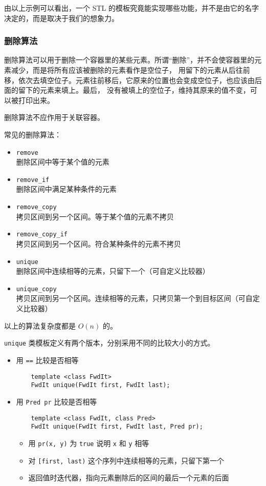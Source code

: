 \documentclass[UTF8]{ctexart}
\begin{document}
由以上示例可以看出，一个 STL 的模板究竟能实现哪些功能，并不是由它的名字决定的，而是取决于我们的想象力。

\subsubsection{删除算法}
删除算法可以用于删除一个容器里的某些元素。所谓“删除”，并不会使容器里的元素减少，而是将所有应该被删除的元素看作是空位子，
用留下的元素从后往前移，依次去填空位子。元素往前移后，它原来的位置也会变成空位子，也应该由后面的留下的元素来填上。最后，
没有被填上的空位子，维持其原来的值不变，可以被打印出来。

删除算法不应作用于关联容器。

常见的删除算法：
\begin{itemize}
    \item \texttt{remove} \\
    删除区间中等于某个值的元素
    \item \texttt{remove\_if} \\
    删除区间中满足某种条件的元素
    \item \texttt{remove\_copy} \\
    拷贝区间到另一个区间。等于某个值的元素不拷贝
    \item \texttt{remove\_copy\_if} \\
    拷贝区间到另一个区间。符合某种条件的元素不拷贝
    \item \texttt{unique} \\
    删除区间中连续相等的元素，只留下一个（可自定义比较器）
    \item \texttt{unique\_copy} \\
    拷贝区间到另一个区间。连续相等的元素，只拷贝第一个到目标区间（可自定义比较器）
\end{itemize}

以上的算法复杂度都是 $O(n)$ 的。

\texttt{unique} 类模板定义有两个版本，分别采用不同的比较大小的方式。
\begin{itemize}
    \item 用 \texttt{==} 比较是否相等
    \begin{verbatim}
    template <class FwdIt>
    FwdIt unique(FwdIt first, FwdIt last);
    \end{verbatim}
    \item 用 \texttt{Pred pr} 比较是否相等
    \begin{verbatim}
    template <class FwdIt, class Pred>
    FwdIt unique(FwdIt first, FwdIt last, Pred pr);
    \end{verbatim}
    \begin{itemize}
        \item 用 \texttt{pr(x, y)} 为 \texttt{true} 说明 \texttt{x} 和 \texttt{y} 相等
        \item 对 \texttt{[first, last)} 这个序列中连续相等的元素，只留下第一个
        \item 返回值时迭代器，指向元素删除后的区间的最后一个元素的后面
    \end{itemize}
\end{itemize}
\end{document}

